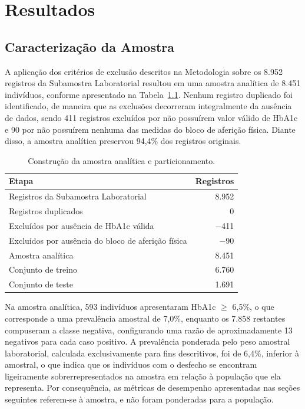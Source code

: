 \chapter{Resultados}\label{cap:resultados}

\section{Caracterização da Amostra}\label{sec:res-amostra}
A aplicação dos critérios de exclusão descritos na Metodologia sobre os 8.952 registros da Subamostra Laboratorial resultou em uma amostra analítica de 8.451 indivíduos, conforme apresentado na Tabela~\ref{tab:funil-amostra}. Nenhum registro duplicado foi identificado, de maneira que as exclusões decorreram integralmente da ausência de dados, sendo 411 registros excluídos por não possuírem valor válido de HbA1c e 90 por não possuírem nenhuma das medidas do bloco de aferição física. Diante disso, a amostra analítica preservou 94,4\% dos registros originais.

\begin{table}[htb]
  \centering
  \caption{\label{tab:funil-amostra}Construção da amostra analítica e particionamento.}
  \begin{tabular}{lr}
    \hline
    Etapa & Registros \\ \hline
    Registros da Subamostra Laboratorial & 8.952 \\
    Registros duplicados & 0 \\
    Excluídos por ausência de HbA1c válida & $-$411 \\
    Excluídos por ausência do bloco de aferição física & $-$90 \\
    Amostra analítica & 8.451 \\
    Conjunto de treino & 6.760 \\
    Conjunto de teste & 1.691 \\ \hline
  \end{tabular}
\end{table}

Na amostra analítica, 593 indivíduos apresentaram HbA1c $\geq$ 6,5\%, o que corresponde a uma prevalência amostral de 7,0\%, enquanto os 7.858 restantes compuseram a classe negativa, configurando uma razão de aproximadamente 13 negativos para cada caso positivo. A prevalência ponderada pelo peso amostral laboratorial, calculada exclusivamente para fins descritivos, foi de 6,4\%, inferior à amostral, o que indica que os indivíduos com o desfecho se encontram ligeiramente sobrerrepresentados na amostra em relação à população que ela representa. Por consequência, as métricas de desempenho apresentadas nas seções seguintes referem-se à amostra, e não foram ponderadas para a população.

